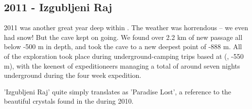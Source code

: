 \begin{tcolorbox}
\chapter{2011 - Izgubljeni Raj}

2011 was another great year deep within . The weather
was horrendous -- we even had snow! But the cave kept on going. We
found over 2.2 km of new passage all below -500 m in depth, and took the
cave to a new deepest point of -888 m. All of the exploration took place
during underground-camping trips based at 
(, -550 m), with the keenest of expeditioneers managing
a total of around seven nights underground during the four week
expedition.

'Izgubljeni Raj' quite simply translates as 'Paradise Lost', a reference to the beautiful crystals found in the  during 2010.

\end{tcolorbox}
\BgThispage









